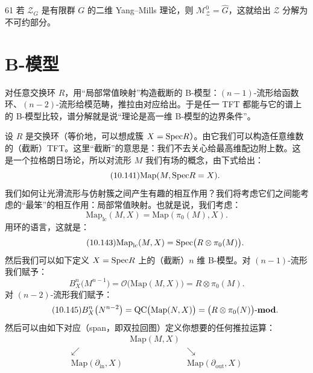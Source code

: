 \begin{srcex}{61}
若 $\mathcal{Z}_G$ 是有限群 $G$ 的二维 Yang--Mills 理论，则 $\mathcal{M}_{\mathcal{Z}}^{0}=\widehat{G}$，这就给出 $\mathcal{Z}$ 分解为不可约部分。
\end{srcex}


\section{B-模型}\label{sec:10-7}

\begin{sectionkey}
对任意交换环 $R$，用“局部常值映射”构造截断的 B-模型：$(n-1)$-流形给函数环、$(n-2)$-流形给模范畴，推拉由对应给出。于是任一 TFT 都能与它的谱上的 B-模型比较，谱分解就是说“理论是高一维 B-模型的边界条件”。
\end{sectionkey}

设 $R$ 是交换环（等价地，可以想成簇 $X=\mathrm{Spec} R$）。由它我们可以构造任意维数的（截断）TFT。这里“截断”的意思是：我们不去关心给最高维配边附上数。这是一个拉格朗日场论，所以对流形 $M$ 我们有场的概念，由下式给出：
\begin{equation}\tag{10.141}
\mathrm{Map}(M,\mathrm{Spec} R=X).
\end{equation}
我们如何让光滑流形与仿射簇之间产生有趣的相互作用？我们将考虑它们之间能考虑的“最笨”的相互作用：局部常值映射。也就是说，我们考虑：
\begin{equation}\tag{10.142}
\mathrm{Map}_{\mathrm{lc}}(M,X)=\mathrm{Map}(\pi_0(M),X).
\end{equation}
用环的语言，这就是：
\begin{equation}\tag{10.143}
\mathrm{Map}_{\mathrm{lc}}(M,X)=\mathrm{Spec}\big(R\otimes\pi_0(M)\big).
\end{equation}
然后我们可以如下定义 $X=\mathrm{Spec} R$ 上的（截断）$n$ 维 B-模型。对 $(n-1)$-流形我们赋予：
\begin{equation}\tag{10.144}
B_X^{n}\big(M^{n-1}\big)=\mathcal{O}\big(\mathrm{Map}(M,X)\big)=R\otimes\pi_0(M).
\end{equation}
对 $(n-2)$-流形我们赋予：
\begin{equation}\tag{10.145}
B_X^{n}\big(N^{n-2}\big)=\mathrm{QC}\big(\mathrm{Map}(N,X)\big)=\big(R\otimes\pi_0(N)\big)\text{-}\mathbf{mod}.
\end{equation}
然后可以由如下对应（span，即双拉回图）定义你想要的任何推拉运算：
\begin{equation}\tag{10.146}
\begin{array}{ccc}
& \mathrm{Map}(M,X) &\\[4pt]
\swarrow & & \searrow\\[4pt]
\mathrm{Map}(\partial_{\mathrm{in}},X) & & \mathrm{Map}(\partial_{\mathrm{out}},X)
\end{array}
\end{equation}

